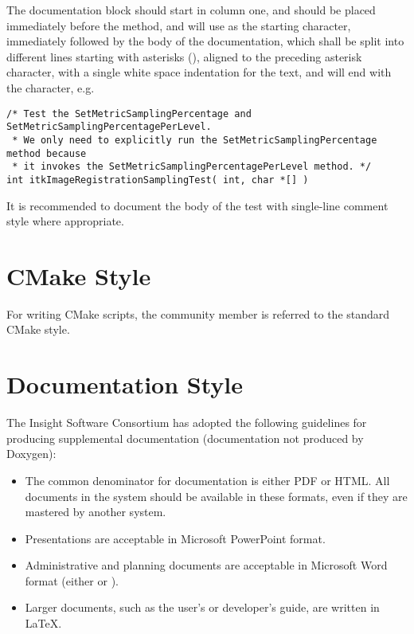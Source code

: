 The documentation block should start in column one, and should be placed
immediately before the  method, and will use \code{/*} as the
starting character, immediately followed by the body of the documentation, which
shall be split into different lines starting with asterisks (\code{*}), aligned
to the preceding asterisk character, with a single white space indentation for
the text, and will end with the \code{*/} character, e.g.

\small
\begin{verbatim}
/* Test the SetMetricSamplingPercentage and SetMetricSamplingPercentagePerLevel.
 * We only need to explicitly run the SetMetricSamplingPercentage method because
 * it invokes the SetMetricSamplingPercentagePerLevel method. */
int itkImageRegistrationSamplingTest( int, char *[] )
\end{verbatim}
\normalsize

It is recommended to document the body of the test with single-line comment
style where appropriate.


\section{CMake Style}
\label{sec:CMakeStyle}

For writing CMake scripts, the community member is referred to the standard
CMake style.


\section{Documentation Style}
\label{sec:DocumentationStyle}

The Insight Software Consortium has adopted the following guidelines for
producing supplemental documentation (documentation not produced by Doxygen):
\begin{itemize}
\item The common denominator for documentation is either PDF or HTML. All
documents in the system should be available in these formats, even if they are
mastered by another system.
\item Presentations are acceptable in Microsoft PowerPoint format.
\item Administrative and planning documents are acceptable in Microsoft Word
format (either  or ).
\item Larger documents, such as the user's or developer's guide, are written in
\LaTeX.
\end{itemize}
